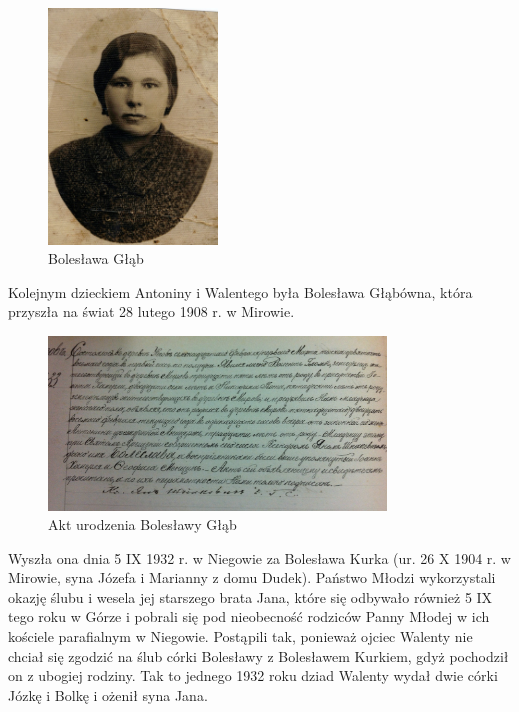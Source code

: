 \begin{figure}[!h]
\begin{center}
\includegraphics[width=0.4\textwidth]{zdjecia/boleslawa_glab.jpg}
\caption{Bolesława Głąb}
\label{rys:boleslawa_glab}
\end{center}
\end{figure}

Kolejnym dzieckiem Antoniny i Walentego była Bolesława Głąbówna, która przyszła na świat 28 lutego 1908 r. w Mirowie.

\begin{figure}[!h]
\begin{center}
\includegraphics[width=0.8\textwidth]{zdjecia/akt_urodzenia_boleslawy_glab.jpg}
\caption{Akt urodzenia Bolesławy Głąb}
\label{rys:akt_urodzenia_boleslawy_glab}
\end{center}
\end{figure}

Wyszła ona dnia 5 IX 1932 r. w Niegowie za Bolesława Kurka (ur. 26 X 1904 r. w Mirowie, syna Józefa i Marianny z domu Dudek). Państwo Młodzi wykorzystali okazję ślubu i wesela jej starszego brata Jana, które się odbywało również 5 IX tego roku w Górze i pobrali się pod nieobecność rodziców Panny Młodej w ich kościele parafialnym w Niegowie. Postąpili tak, ponieważ ojciec Walenty nie chciał się zgodzić na ślub córki Bolesławy z Bolesławem Kurkiem, gdyż pochodził on z ubogiej rodziny. Tak to jednego 1932 roku dziad Walenty wydał dwie córki Józkę i Bolkę i ożenił syna Jana.

